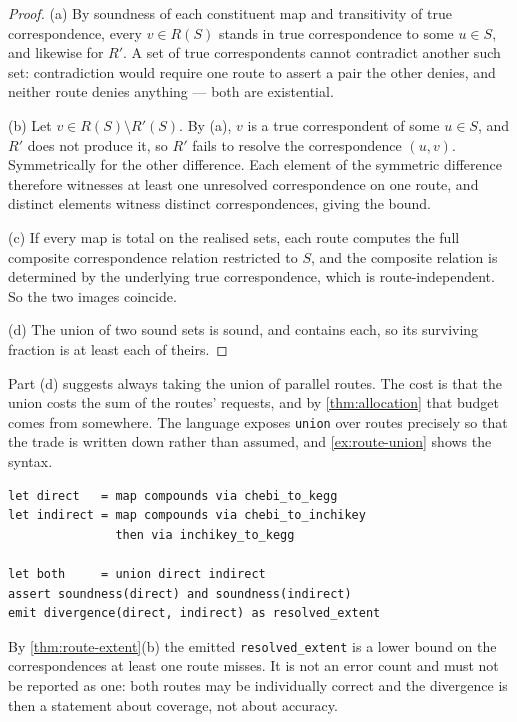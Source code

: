 \begin{proof}
(a) By soundness of each constituent map and transitivity of true
correspondence, every $v \in R(S)$ stands in true correspondence to some
$u \in S$, and likewise for $R'$. A set of true correspondents cannot
contradict another such set: contradiction would require one route to assert a
pair the other denies, and neither route denies anything --- both are
existential.

(b) Let $v \in R(S) \setminus R'(S)$. By (a), $v$ is a true correspondent of
some $u \in S$, and $R'$ does not produce it, so $R'$ fails to resolve the
correspondence $(u,v)$. Symmetrically for the other difference. Each element of
the symmetric difference therefore witnesses at least one unresolved
correspondence on one route, and distinct elements witness distinct
correspondences, giving the bound.

(c) If every map is total on the realised sets, each route computes the full
composite correspondence relation restricted to $S$, and the composite relation
is determined by the underlying true correspondence, which is route-independent.
So the two images coincide.

(d) The union of two sound sets is sound, and contains each, so its surviving
fraction is at least each of theirs.
\end{proof}

\begin{remark}
Part (d) suggests always taking the union of parallel routes. The cost is that
the union costs the sum of the routes' requests, and by
\cref{thm:allocation} that budget comes from somewhere. The language exposes
\texttt{union} over routes precisely so that the trade is written down rather
than assumed, and \cref{ex:route-union} shows the syntax.
\end{remark}

\begin{example}
\label{ex:route-union}
\begin{lstlisting}[caption={Parallel routes made explicit. The plan asserts nothing about which is better; it measures the divergence and reports it.},label=lst:routes]
let direct   = map compounds via chebi_to_kegg
let indirect = map compounds via chebi_to_inchikey
               then via inchikey_to_kegg

let both     = union direct indirect
assert soundness(direct) and soundness(indirect)
emit divergence(direct, indirect) as resolved_extent
\end{lstlisting}
By \cref{thm:route-extent}(b) the emitted \texttt{resolved\_extent} is a lower
bound on the correspondences at least one route misses. It is not an error
count and must not be reported as one: both routes may be individually correct
and the divergence is then a statement about coverage, not about accuracy.
\end{example}

